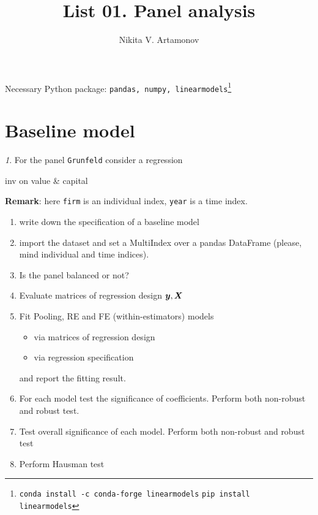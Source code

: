\documentclass[12pt]{article}
\title{List 01. Panel analysis}
\author{Nikita V. Artamonov}
\theoremstyle{remark}
\newtheorem{exercise}{}[section]
\begin{document}
\maketitle

Necessary Python package: \texttt{pandas, numpy, linearmodels}\footnote{\texttt{conda install -c conda-forge linearmodels}
\texttt{pip install linearmodels}}

\tableofcontents

\section{Baseline model}

\begin{exercise}
For the panel \texttt{Grunfeld} consider a regression
\begin{center}
	inv on value \& capital
\end{center}
\textbf{Remark}: here \texttt{firm} is an individual index, 
\texttt{year} is a time index.
\begin{enumerate}
	\item write down the specification of a baseline model
	\item import the dataset and set a MultiIndex over a pandas DataFrame 
	(please, mind  individual and time indices).
	\item Is the panel balanced or not?
	\item Evaluate matrices of regression design \({\bm y}, {\bm X}\)
	\item Fit Pooling, RE and FE (within-estimators) models
	\begin{itemize}
		\item via matrices of regression design
		\item via regression specification
	\end{itemize}
	and report the fitting result.
	\item For each model test the significance of coefficients. Perform both
	non-robust and robust test.
	\item Test overall significance of each model. Perform both
	non-robust and robust test
	\item Perform Hausman test
\end{enumerate}
\end{exercise}
\end{document}
